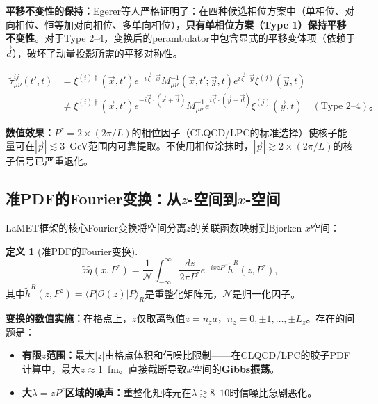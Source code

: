 \documentclass[12pt,a4paper]{ctexart}
\theoremstyle{definition}
\newtheorem{definition}{定义}[section]
\begin{document}
\textbf{平移不变性的保持：}Egerer等人\cite{Egerer2021a}严格证明了：在四种候选相位方案中（单相位、对向相位、恒等加对向相位、多单向相位），\textbf{只有单相位方案（Type 1）保持平移不变性}。对于Type 2--4，变换后的perambulator中包含显式的平移变体项（依赖于$\vec{d}$），破坏了动量投影所需的平移对称性\cite{Egerer2021a}。

\begin{equation}
\begin{aligned}
\tilde{\tau}^{ij}_{\mu\nu}(t', t) &= \xi^{(i)\dagger}(\vec{x}, t') e^{-i\vec{\zeta}\cdot\vec{x}} M^{-1}_{\mu\nu}(\vec{x}, t'; \vec{y}, t) e^{i\vec{\zeta}\cdot\vec{y}} \xi^{(j)}(\vec{y}, t) \\
&\neq \xi^{(i)\dagger}(\vec{x}, t') e^{-i\vec{\zeta}\cdot(\vec{x}+\vec{d})} M^{-1}_{\mu\nu} e^{i\vec{\zeta}\cdot(\vec{y}+\vec{d})} \xi^{(j)}(\vec{y}, t) \quad (\text{Type 2--4})。
\end{aligned}
\label{eq:translation_invariance}
\end{equation}

\textbf{数值效果：}$P^z = 2 \times (2\pi/L)$的相位因子（CLQCD/LPC的标准选择\cite{Chen2025gluon,NoteGluonPDFs}）使核子能量可在$|\vec{p}| \lesssim 3$~GeV范围内可靠提取。不使用相位涂抹时，$|\vec{p}| \gtrsim 2 \times (2\pi/L)$的核子信号已严重退化\cite{Egerer2021a}。

\subsection{准PDF的Fourier变换：从$z$-空间到$x$-空间}

LaMET框架的核心Fourier变换将空间分离$z$的关联函数映射到Bjorken-$x$空间\cite{Ji2013Euclidean,Chen2025gluon}：

\begin{definition}[准PDF的Fourier变换]
\begin{equation}
\boxed{\tilde{x}\tilde{q}(x, P^z) = \frac{1}{\mathcal{N}} \int_{-\infty}^{\infty} \frac{dz}{2\pi P^z} e^{-ixzP^z} \tilde{h}^R(z, P^z)},
\label{eq:quasi_pdf_fourier}
\end{equation}
其中$\tilde{h}^R(z, P^z) = \langle P|\mathcal{O}(z)|P\rangle_R$是重整化矩阵元，$\mathcal{N}$是归一化因子。
\end{definition}

\textbf{变换的数值实施：}在格点上，$z$仅取离散值$z = n_z a$，$n_z = 0, \pm1, \ldots, \pm L_z$。存在的问题是：
\begin{itemize}
    \item \textbf{有限$z$范围：}最大$|z|$由格点体积和信噪比限制——在CLQCD/LPC的胶子PDF计算中\cite{Chen2025gluon}，最大$z \approx 1$~fm。直接截断导致$x$空间的\textbf{Gibbs振荡}。
    \item \textbf{大$\lambda = zP^z$区域的噪声：}重整化矩阵元在$\lambda \gtrsim 8$--$10$时信噪比急剧恶化。
\end{itemize}
\end{document}
